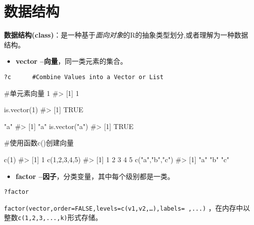 \documentclass[
  letterpaper,
  DIV=11,
  numbers=noendperiod]{scrreprt}
\newenvironment{Shaded}{\begin{snugshade}}{\end{snugshade}}
\newcommand{\CommentTok}[1]{\textcolor[rgb]{0.37,0.37,0.37}{#1}}
\newcommand{\DecValTok}[1]{\textcolor[rgb]{0.68,0.00,0.00}{#1}}
\newcommand{\FunctionTok}[1]{\textcolor[rgb]{0.28,0.35,0.67}{#1}}
\newcommand{\NormalTok}[1]{\textcolor[rgb]{0.00,0.23,0.31}{#1}}
\newcommand{\StringTok}[1]{\textcolor[rgb]{0.13,0.47,0.30}{#1}}
\providecommand{\tightlist}{%
  \setlength{\itemsep}{0pt}\setlength{\parskip}{0pt}}\usepackage{longtable,booktabs,array}
\begin{document}

\hypertarget{ux6570ux636eux7ed3ux6784}{%
\chapter*{数据结构}\label{ux6570ux636eux7ed3ux6784}}


\textbf{数据结构(class)}：是一种基于\emph{面向对象}的R的抽象类型划分,或者理解为一种数据结构。

\begin{itemize}
\tightlist
\item
  \textbf{vector --向量}，同一类元素的集合。
\end{itemize}

\texttt{?c\ \ \ \ \ \ \#Combine\ Values\ into\ a\ Vector\ or\ List}

\begin{Shaded}
\begin{Highlighting}[]
\CommentTok{\#单元素向量}
\DecValTok{1}
\CommentTok{\#\textgreater{} [1] 1}

\FunctionTok{is.vector}\NormalTok{(}\DecValTok{1}\NormalTok{)}
\CommentTok{\#\textgreater{} [1] TRUE}

\StringTok{"a"}
\CommentTok{\#\textgreater{} [1] "a"}
\FunctionTok{is.vector}\NormalTok{(}\StringTok{"a"}\NormalTok{)}
\CommentTok{\#\textgreater{} [1] TRUE}

\CommentTok{\#使用函数c()创建向量}

\FunctionTok{c}\NormalTok{(}\DecValTok{1}\NormalTok{)}
\CommentTok{\#\textgreater{} [1] 1}
\FunctionTok{c}\NormalTok{(}\DecValTok{1}\NormalTok{,}\DecValTok{2}\NormalTok{,}\DecValTok{3}\NormalTok{,}\DecValTok{4}\NormalTok{,}\DecValTok{5}\NormalTok{)}
\CommentTok{\#\textgreater{} [1] 1 2 3 4 5}
\FunctionTok{c}\NormalTok{(}\StringTok{"a"}\NormalTok{,}\StringTok{"b"}\NormalTok{,}\StringTok{"c"}\NormalTok{)}
\CommentTok{\#\textgreater{} [1] "a" "b" "c"}
\end{Highlighting}
\end{Shaded}

\begin{itemize}
\tightlist
\item
  \textbf{factor --因子}，分类变量，其中每个级别都是一类。
\end{itemize}

\texttt{?factor}

\texttt{factor(vector,order=FALSE,levels=c(v1,v2,…),labels=\ ,...)}
，在内存中以整数\texttt{c(1,2,3,...,k)}形式存储。
\end{document}
